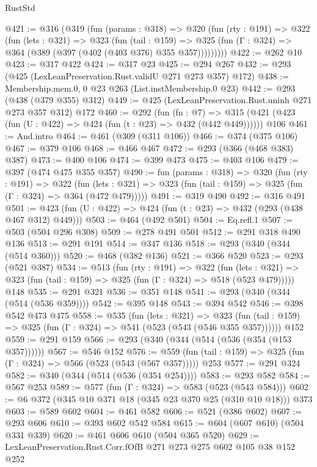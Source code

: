 \begin{lexlean}{RustStd}
\begin{coremodule}
@421 := @316
    (@319
      (fun (params : @318) =>
      @320
        (fun (rty : @191) =>
        @322
          (fun (lets : @321) =>
          @323
            (fun (tail : @159) =>
            @325 (fun (Γ : @324) => @364 (@389 (@397 (@402 (@403 @376) @355 @357)))))))))
@422 := @262 @10
@423 := @317 @422
@424 := @317 @23
@425 := @294 @267
@432 := @293 (@425 (LexLeanPreservation.Rust.validU @271 @273 @357) @172)
@438 := Membership.mem.{0, 0} @23 @263 (List.instMembership.{0} @23)
@442 := @293 (@438 (@379 @355) @312)
@449 := @425 (LexLeanPreservation.Rust.uninh @271 @273 @357 @312) @172
@460 := @292
    (fun (fn : @7) =>
    @315 (@421 (@423 (fun (U : @422) => @424 (fun (t : @23) => @432 (@442 @449))))))
    @106
@461 := And.intro
@464 := @461 (@309 (@311 @106))
@466 := @374 (@375 @106)
@467 := @379 @106
@468 := @466 @467
@472 := @293 (@366 (@468 @383) @387)
@473 := @400 @106
@474 := @399 @473
@475 := @403 @106
@479 := @397 (@474 @475 @355 @357)
@490 := fun (params : @318) =>
  @320
    (fun (rty : @191) =>
    @322
      (fun (lets : @321) => @323 (fun (tail : @159) => @325 (fun (Γ : @324) => @364 (@472 @479)))))
@491 := @319 @490
@492 := @316 @491
@501 := @423 (fun (U : @422) => @424 (fun (t : @23) => @432 (@293 (@438 @467 @312) @449)))
@503 := @464 (@492 @501)
@504 := Eq.refl.{1}
@507 := @503 (@504 @296 @308)
@509 := @278 @491 @501
@512 := @291 @318 @490 @136
@513 := @291 @191
@514 := @347 @136
@518 := @293 (@340 (@344 (@514 @360)))
@520 := @468 (@382 @136)
@521 := @366 @520
@523 := @293 (@521 @387)
@534 := @513
    (fun (rty : @191) =>
    @322
      (fun (lets : @321) => @323 (fun (tail : @159) => @325 (fun (Γ : @324) => @518 (@523 @479)))))
    @148
@535 := @291 @321
@536 := @351 @148
@541 := @293 (@340 (@344 (@514 (@536 @359))))
@542 := @395 @148
@543 := @394 @542
@546 := @398 @542 @473 @475
@558 := @535
    (fun (lets : @321) =>
    @323 (fun (tail : @159) => @325 (fun (Γ : @324) => @541 (@523 (@543 (@546 @355 @357))))))
    @152
@559 := @291 @159
@566 := @293 (@340 (@344 (@514 (@536 (@354 (@153 @357))))))
@567 := @546 @152
@576 := @559 (fun (tail : @159) => @325 (fun (Γ : @324) => @566 (@523 (@543 (@567 @357))))) @253
@577 := @291 @324
@582 := @340 (@344 (@514 (@536 (@354 @254))))
@583 := @293 @582
@584 := @567 @253
@589 := @577 (fun (Γ : @324) => @583 (@523 (@543 @584)))
@602 := @6 @372 (@345 @10 @371 @18 (@345 @23 @370 @25 (@310 @10 @18))) @373
@603 := @589 @602
@604 := @461 @582
@606 := @521 (@386 @602)
@607 := @293 @606
@610 := @393 @602 @542 @584
@615 := @604 (@607 @610) (@504 @331 @339)
@620 := @461 @606 @610 (@504 @365 @520)
@629 := LexLeanPreservation.Rust.Corr.fOfB @271 @273 @275 @602 @105 @38 @152 @252

\end{coremodule}
\end{lexlean}
